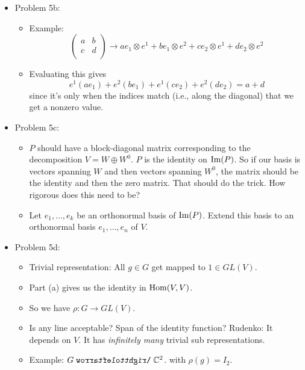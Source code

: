 \documentclass[../notes.tex]{subfiles}
\begin{document}
\begin{itemize}
\begin{itemize}
    \end{itemize}
    \item Problem 5b:
    \begin{itemize}
        \item Example:
        \begin{equation*}
            \begin{pmatrix}
                a & b\\
                c & d\\
            \end{pmatrix}
            \to
            ae_1\otimes e^1+be_1\otimes e^2+ce_2\otimes e^1+de_2\otimes e^2
        \end{equation*}
        \item Evaluating this gives
        \begin{equation*}
            e^1(ae_1)+e^2(be_1)+e^1(ce_2)+e^2(de_2) = a+d
        \end{equation*}
        since it's only when the indices match (i.e., along the diagonal) that we get a nonzero value.
    \end{itemize}
    \item Problem 5c:
    \begin{itemize}
        \item $P$ should have a block-diagonal matrix corresponding to the decomposition $V=W\oplus W^0$. $P$ is the identity on $\operatorname{Im}(P)$. So if our basis is vectors spanning $W$ and then vectors spanning $W^0$, the matrix should be the identity and then the zero matrix. That should do the trick. How rigorous does this need to be?
        \item Let $e_1,\dots,e_k$ be an orthonormal basis of $\operatorname{Im}(P)$. Extend this basis to an orthonormal basis $e_1,\dots,e_n$ of $V$.\par
    \end{itemize}
    \item Problem 5d:
    \begin{itemize}
        \item Trivial representation: All $g\in G$ get mapped to $1\in GL(V)$.
        \item Part (a) gives us the identity in $\operatorname{Hom}(V,V)$.
        \item So we have $\rho:G\to GL(V)$.
        \item Is any line acceptable? Span of the identity function? Rudenko: It depends on $V$. It has \emph{infinitely many} trivial sub representations.
        \item Example: $G\acts \C^2$. with $\rho(g)=I_2$.

\end{itemize}
\end{itemize}
\end{document}
